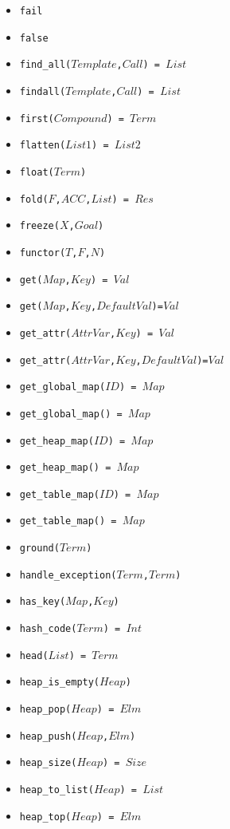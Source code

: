 \documentclass[10pt]{article}
\begin{document}
\begin{multicols}{2}
\begin{scriptsize}
\begin{itemize}
    \item \texttt{fail}
    \item \texttt{false}
    \item \texttt{find\_all($Template$,$Call$) = $List$}
    \item \texttt{findall($Template$,$Call$) = $List$}
    \item \texttt{first($Compound$) = $Term$}
    \item \texttt{flatten($List1$) = $List2$}
    \item \texttt{float($Term$)}
    \item \texttt{fold($F$,$ACC$,$List$) = $Res$}
    \item \texttt{freeze($X$,$Goal$)}
    \item \texttt{functor($T$,$F$,$N$)}
    \item \texttt{get($Map$,$Key$) = $Val$}
    \item \texttt{get($Map$,$Key$,$DefaultVal$)=$Val$}
    \item \texttt{get\_attr($AttrVar$,$Key$) = $Val$}
    \item \texttt{get\_attr($AttrVar$,$Key$,$DefaultVal$)=$Val$}
    \item \texttt{get\_global\_map($ID$) = $Map$}
    \item \texttt{get\_global\_map() = $Map$}
    \item \texttt{get\_heap\_map($ID$) = $Map$}
    \item \texttt{get\_heap\_map() = $Map$}
    \item \texttt{get\_table\_map($ID$) = $Map$}
    \item \texttt{get\_table\_map() = $Map$}
    \item \texttt{ground($Term$)}
    \item \texttt{handle\_exception($Term$,$Term$)}
    \item \texttt{has\_key($Map$,$Key$)}
    \item \texttt{hash\_code($Term$) = $Int$}
    \item \texttt{head($List$) = $Term$}
    \item \texttt{heap\_is\_empty($Heap$)}
    \item \texttt{heap\_pop($Heap$) = $Elm$}
    \item \texttt{heap\_push($Heap$,$Elm$)}
    \item \texttt{heap\_size($Heap$) = $Size$}
    \item \texttt{heap\_to\_list($Heap$) = $List$}
    \item \texttt{heap\_top($Heap$) = $Elm$}

\end{itemize}
\end{scriptsize}
\end{multicols}
\end{document}
